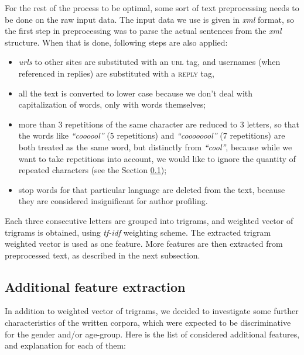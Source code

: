 \documentclass[10pt, a4paper]{article}
\begin{document}
For the rest of the process to be optimal, some sort of text preprocessing needs to be done on the raw input data.
The input data we use is given in \textit{xml} format, so the first step in preprocessing was to parse the actual sentences from the \textit{xml} structure.
When that is done, following steps are also applied:
\begin{itemize}
	\item \textit{urls} to other sites are substituted with an \textsc{url} tag, and usernames (when referenced in replies) are substituted with a \textsc{reply} tag,
	\item all the text is converted to lower case because we don't deal with capitalization of words, only with words themselves;
	\item more than 3 repetitions of the same character are reduced to 3 letters, so that the words like \textit{``coooool''} (5 repetitions) and \textit{``coooooool''} (7 repetitions) are both treated as the same word, but distinctly from \textit{``cool''}, because while we want to take repetitions into account, we would like to ignore the quantity of repeated characters (see the Section \ref{sec:features});
	\item stop words \citep{nltk} for that particular language are deleted from the text, because they are considered insignificant for author profiling.
\end{itemize}

Each three consecutive letters are grouped into trigrams, and weighted vector of trigrams is obtained, using \textit{tf-idf} weighting scheme.
The extracted trigram weighted vector is used as one feature.
More features are then extracted from preprocessed text, as described in the next subsection.

\subsection{Additional feature extraction}
\label{sec:features}
In addition to weighted vector of trigrams, we decided to investigate some further characteristics of the written corpora, which were expected to be discriminative for the gender and/or age-group.
Here is the list of considered additional features, and explanation for each of them:
\end{document}

